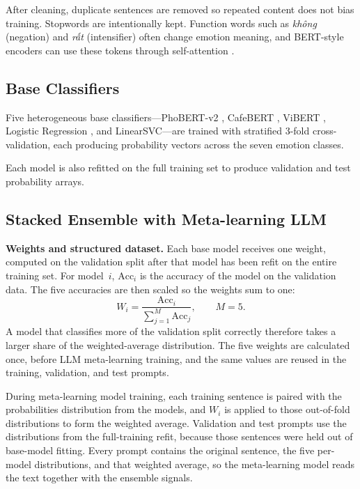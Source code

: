 \documentclass[conference]{IEEEtran}
\begin{document}
After cleaning, duplicate sentences are removed so repeated content does not bias training. Stopwords are intentionally kept. Function words such as \textit{không} (negation) and \textit{rất} (intensifier) often change emotion meaning, and BERT-style encoders can use
these tokens through self-attention \cite{nguyen2020phobert,do2024vlue}.

\subsection{Base Classifiers}
Five heterogeneous base classifiers—PhoBERT-v2 \cite{nguyen2020phobert}, CafeBERT \cite{do2024vlue}, ViBERT \cite{the2020improving}, Logistic Regression \cite{lin2023linear}, and LinearSVC—are trained with stratified 3-fold cross-validation, each producing probability vectors across the seven emotion classes.

Each model is also refitted on the full training set to produce validation and test
probability arrays.

\subsection{Stacked Ensemble with Meta-learning LLM}

\textbf{Weights and structured dataset.}
Each base model receives one weight, computed on the validation split after that model has been refit on the entire training set. For model~$i$, $\mathrm{Acc}_i$ is the accuracy of the model on the validation data. The five accuracies are then scaled so the weights sum to one:
\begin{equation}
  W_i = \frac{\mathrm{Acc}_i}{\sum_{j=1}^{M} \mathrm{Acc}_j}, \qquad M = 5.
  \label{eq:ensemble_weight}
\end{equation}
A model that classifies more of the validation split correctly therefore takes a larger share of the weighted-average distribution. The five weights are calculated once, before LLM meta-learning training, and the same values are reused in the training, validation, and test prompts.

During meta-learning model training, each training sentence is paired with the probabilities distribution from the models, and $W_i$ is applied to those out-of-fold distributions to form the weighted average. Validation and test prompts use the distributions from the full-training refit, because those sentences were held out of base-model fitting. Every prompt contains the original sentence, the five per-model distributions, and that weighted average, so the meta-learning model reads the text together with the ensemble signals.
\end{document}
